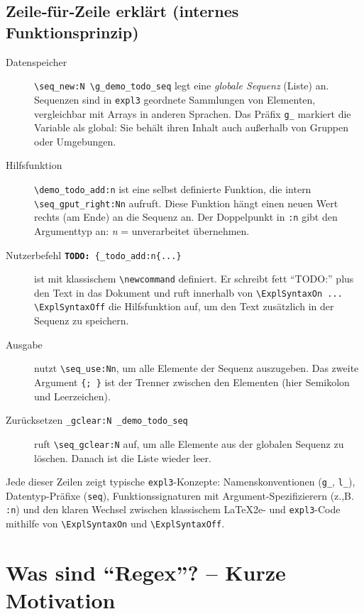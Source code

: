 \documentclass[11pt,a4paper]{book}
\newcommand{\todo}[1]{\textbf{TODO:}~#1\ExplSyntaxOn\demo_todo_add:n{#1}\ExplSyntaxOff}
\newcommand{\printtodos}{\par\medskip\textbf{Gesammelte TODOs: }\ExplSyntaxOn\seq_use:Nn \g_demo_todo_seq {; }\ExplSyntaxOff\par}
\newcommand{\cleartodos}{\ExplSyntaxOn\seq_gclear:N \g_demo_todo_seq\ExplSyntaxOff}
\begin{document}
\section{Zeile‑für‑Zeile erklärt (internes Funktionsprinzip)}
\begin{description}
\item[Datenspeicher] \verb|\seq_new:N \g_demo_todo_seq| legt eine \emph{globale Sequenz} (Liste) an. Sequenzen sind in \texttt{expl3} geordnete Sammlungen von Elementen, vergleichbar mit Arrays in anderen Sprachen. Das Präfix \texttt{g\_} markiert die Variable als global: Sie behält ihren Inhalt auch außerhalb von Gruppen oder Umgebungen.

\item[Hilfsfunktion] \verb|\demo_todo_add:n| ist eine selbst definierte Funktion, die intern \verb|\seq_gput_right:Nn| aufruft. Diese Funktion hängt einen neuen Wert rechts (am Ende) an die Sequenz an. Der Doppelpunkt in \texttt{:n} gibt den Argumenttyp an: \emph{n} = unverarbeitet übernehmen.

\item[Nutzerbefehl \texttt{\string\todo\{...\}}] ist mit klassischem \verb|\newcommand| definiert. Er schreibt fett \enquote{TODO:} plus den Text in das Dokument und ruft innerhalb von \verb|\ExplSyntaxOn ... \ExplSyntaxOff| die Hilfsfunktion auf, um den Text zusätzlich in der Sequenz zu speichern.

\item[Ausgabe \texttt{\string\printtodos}] nutzt \verb|\seq_use:Nn|, um alle Elemente der Sequenz auszugeben. Das zweite Argument \verb|{; }| ist der Trenner zwischen den Elementen (hier Semikolon und Leerzeichen).

\item[Zurücksetzen \texttt{\string\cleartodos}] ruft \verb|\seq_gclear:N| auf, um alle Elemente aus der globalen Sequenz zu löschen. Danach ist die Liste wieder leer.
\end{description}

Jede dieser Zeilen zeigt typische \texttt{expl3}-Konzepte: Namenskonventionen (\texttt{g\_}, \texttt{l\_}), Datentyp-Präfixe (\texttt{seq}), Funktionssignaturen mit Argument-Spezifizierern (z.,B. \texttt{:n}) und den klaren Wechsel zwischen klassischem LaTeX2e- und \texttt{expl3}-Code mithilfe von \verb|\ExplSyntaxOn| und \verb|\ExplSyntaxOff|.




\chapter{Was sind \enquote{Regex}? – Kurze Motivation}
\end{document}
